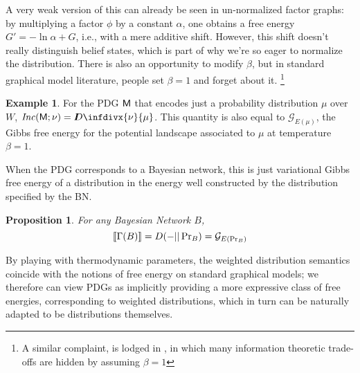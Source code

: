 \documentclass{article}
\theoremstyle{plain}
\newtheorem{prop}[theorem]{Proposition}
\theoremstyle{definition}
\newtheorem{examplex}{Example}
\theoremstyle{remark}
\newcommand{\thickD}{I\mkern-8muD}
\newcommand{\kldiv}{\thickD\infdivx}%
\DeclarePairedDelimiter{\bbr}{\llbracket}{\rrbracket}
\newcommand{\sfM}{\mathsf M}
\newcommand\inconsist{\mathit{Inc}}
\newcommand\PDGof{\Gamma}
\numberwithin{equation}{section}
\begin{document}
	A very weak version of this can already be seen in un-normalized factor graphs: by multiplying a factor $\phi$ by a constant $\alpha$, one obtains a free energy $G' = - \ln \alpha + G$, i.e., with a mere additive shift. However, this shift doesn't really distinguish belief states, which is part of why we're so eager to normalize the distribution.
	There is also an opportunity to modify $\beta$, but in standard graphical model literature, people set $\beta = 1$ and forget about it.%
		\footnote{A similar complaint, is lodged in \cite{fixing-broken-elbo}, in which many information theoretic trade-offs are hidden by assuming $\beta = 1$}


	\begin{examplex}%
		\label{ex:energy-from-distrib}
		For the PDG $\sf M$ that encodes just a probability distribution $\mu$ over $W$,  $\inconsist(\sfM; \nu) = \kldiv{\nu}{\mu}$. This quantity is also equal to $\mathcal G_{E(\mu)}$, the Gibbs free energy for the potential landscape associated to $\mu$ at temperature $\beta = 1$.
	\end{examplex}


	When the PDG corresponds to a Bayesian network, this is just variational Gibbs free energy of a distribution in the energy well constructed by the distribution specified by the BN.

	\begin{prop}\label{prop:bn-free-energy}
		For any Bayesian Network $B$, 
		\[ \bbr{\PDGof(B)} = D(- || \Pr\nolimits_B) = \mathcal G_{E(\Pr_B)} \]
	\end{prop}
	
	By playing with thermodynamic parameters, the weighted distribution semantics coincide with the notions of free energy on standard graphical models; we therefore can view PDGs as implicitly providing a more expressive class of free energies, corresponding to weighted distributions, which in turn can be naturally adapted to be distributions themselves.
	
\end{document}
